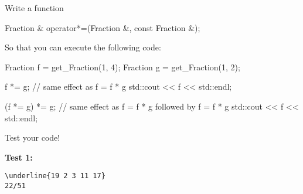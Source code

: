 Write a function
\begin{console}[commandchars=\\\{\}]
Fraction & operator*=(Fraction &, const Fraction &);
\end{console}

So that you can execute the following code:
\begin{console}
Fraction f = get_Fraction(1, 4);
Fraction g = get_Fraction(1, 2);

f *= g; // same effect as f = f * g
std::cout << f << std::endl;

(f *= g) *= g; // same effect as f = f * g followed by f = f * g
std::cout << f << std::endl;
\end{console}

Test your code!

\textbf{Test 1:}
\begin{Verbatim}[frame=single, commandchars=\\\{\}]
\underline{19 2 3 11 17}
22/51
\end{Verbatim}
